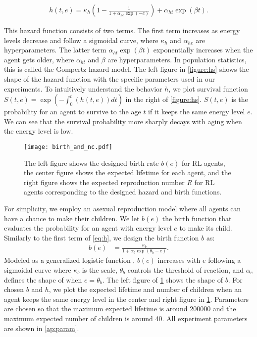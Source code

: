 \begin{align}
  h(t, e) = \kappa_{h} \left(1 - \frac{1}{1 + \alpha_{he} \exp(-e)} \right) + \alpha_{ht} \exp(\beta t). \label{eq:h}
\end{align}

This hazard function\label{eq:h} consists of two terms. The first term increases as energy levels decrease and follow a sigmoidal curve, where $\kappa_{h}$ and $\alpha_{he}$ are hyperparameters. The latter term $\alpha_{ht} \exp(\beta t)$ exponentially increases when the agent gets older, where $\alpha_{ht}$ and $\beta$ are hyperparameters. In population statistics, this is called the Gompertz hazard model\citep{gompertzXXIVNatureFunction1825,kirkwoodDecipheringDeathCommentary2015}. The left figure in \cref{figure:hs} shows the shape of the hazard function with the specific parameters used in our experiments. To intuitively understand the behavior $h$, we plot survival function $S(t, e) = \exp (-\int_{0}^{t}(h(t, e)) dt)$ in the right of \cref{figure:hs}. $S(t, e)$ is the probability for an agent to survive to the age $t$ if it keeps the same energy level $e$. We can see that the survival probability more sharply decays with aging when the energy level is low.

\begin{figure}[t]
  \centering{}
  \texttt{[image: birth\_and\_nc.pdf]}
  \caption{
    The left figure shows the designed birth rate $b(e)$ for RL agents, the center figure shows the expected lifetime for each agent, and the right figure shows the expected reproduction number $R$ for RL agents corresponding to the designed hazard and birth functions.
  }\label{figure:bnc}
\end{figure}

For simplicity, we employ an asexual reproduction model where all agents can have a chance to make their children. We let $b(e)$ the birth function that evaluates the probability for an agent with energy level $e$ to make its child. Similarly to the first term of \cref{eq:h}, we design the birth function $b$ as:
\begin{align}
 b(e) &= \frac{\kappa_{b}}{1 + \alpha_{b}\exp(\theta_{b} - e)}. \label{eq:b}
\end{align}
Modeled as a generalized logistic function \citep{richardsFlexibleGrowthFunction1959}, $b(e)$ increases with $e$ following a sigmoidal curve where $\kappa_{b}$ is the scale, $\theta_{b}$ controls the threshold of reaction, and $\alpha_{e}$ defines the shape of when $e = \theta_{b}$. The left figure of \cref{figure:bnc} shows the shape of $b$. For chosen $b$ and $h$, we plot the expected lifetime and number of children when an agent keeps the same energy level in the center and right figure in \cref{figure:bnc}. Parameters are chosen so that the maximum expected lifetime is around \num{200000} and the maximum expected number of children is around 40. All experiment parameters are shown in \cref{ap:param}.

